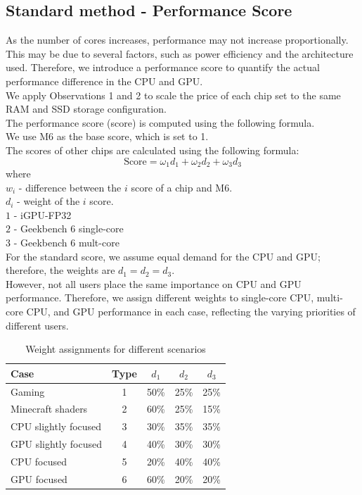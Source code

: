 \documentclass[12pt]{article}
\begin{document}
\subsection{Standard method - Performance Score}
As the number of cores increases, performance may not increase proportionally. This may be due to several factors, such as power efficiency and the architecture used. Therefore, we introduce a performance score to quantify the actual performance difference in the CPU and GPU.\\[6pt]
We apply Observations 1 and 2 to scale the price of each chip set to the same RAM and SSD storage configuration.\\[6pt]
The performance score (score) is computed using the following formula.\\
We use M6 as the base score, which is set to 1.\\
The scores of other chips are calculated using the following formula:
\begin{equation}
\text{Score}=\omega_1 d_1+\omega_2 d_2+\omega_3 d_3
\end{equation}
where\\
$w_i$ - difference between the $i$ score of a chip and M6.\\
$d_i$ - weight of the $i$ score.\\
$1$ - iGPU-FP32\\
$2$ - Geekbench 6 single-core\\
$3$ - Geekbench 6 mult-core\\[6pt]
For the standard score, we assume equal demand for the CPU and GPU; therefore, the weights are $d_1=d_2=d_3$.\\[6pt]
However, not all users place the same importance on CPU and GPU performance. Therefore, we assign different weights to single-core CPU, multi-core CPU, and GPU performance in each case, reflecting the varying priorities of different users.
\begin{table}[h]
\centering
\begin{tabular}{l|c|ccc}
\hline
Case & Type & $d_1$ & $d_2$ & $d_3$ \\
\hline
Gaming &1 & 50\% & 25\% & 25\% \\
Minecraft shaders &2& 60\% & 25\% & 15\% \\
CPU slightly focused &3& 30\% & 35\% & 35\% \\
GPU slightly focused &4 & 40\% & 30\% & 30\% \\
CPU focused &5 & 20\% & 40\% & 40\% \\
GPU focused &6 & 60\% & 20\% & 20\% \\
\hline
\end{tabular}
\caption{Weight assignments for different scenarios}
\end{table}\\
\end{document}
